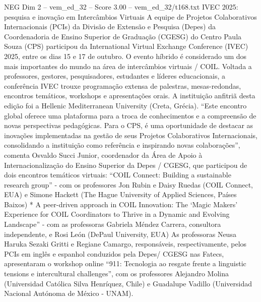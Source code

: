 \begin{textsample}{NEG Dim 2 – vem\_ed\_32 – Score 3.00 – vem\_ed\_32/t168.txt}  \label{ex:f2_neg_142}
IVEC 2025: pesquisa e inovação em Intercâmbios Virtuais A equipe de Projetos Colaborativos Internacionais (PCIs) da Divisão de Extensão e Pesquisa (Depes) da Coordenadoria de Ensino Superior de Graduação (CGESG) do Centro Paula Souza (CPS) participou da International Virtual Exchange Conference (IVEC) 2025, entre os dias 15 e 17 de outubro.
O evento híbrido é considerado um dos mais importantes do mundo na área de intercâmbios virtuais / COIL.
Voltada a professores, gestores, pesquisadores, estudantes e líderes educacionais, a conferência IVEC trouxe programação extensa de palestras, mesas-redondas, encontros temáticos, workshops e apresentações orais.
A instituição anfitriã desta edição foi a Hellenic Mediterranean University (Creta, Grécia). “Este encontro global oferece uma plataforma para a troca de conhecimentos e a compreensão de novas perspectivas pedagógicas.
Para o CPS, é uma oportunidade de destacar as inovações implementadas na gestão de seus Projetos Colaborativos Internacionais, consolidando a instituição como referência e inspirando novas colaborações”, comenta Osvaldo Succi Junior, coordenador da Área de Apoio à Internacionalização do Ensino Superior da Depes / CGESG, que participou de dois encontros temáticos virtuais: “COIL Connect: Building a sustainable research group” - com os professores Jon Rubin e Daisy Ruedas (COIL Connect, EUA) e Simone Hackett (The Hague University of Applied Sciences, Países Baixos) * A peer-driven approach in COIL Innovation: The ‘Magic Makers’ Experience for COIL Coordinators to Thrive in a Dynamic and Evolving Landscape” - com as professoras Gabriela Méndez Carrera, consultora independente, e Rosi León (DePaul University, EUA) As professoras Neusa Haruka Sezaki Gritti e Regiane Camargo, responsáveis, respectivamente, pelos PCIs em inglês e espanhol conduzidos pela Depes/ CGESG nas Fatecs, apresentaram o workshop online “911: Tecnologia ao resgate frente a linguistic tensions e intercultural challenges”, com os professores Alejandro Molina (Universidad Católica Silva Henríquez, Chile) e Guadalupe Vadillo (Universidad Nacional Autónoma de México - UNAM).

\end{textsample}
